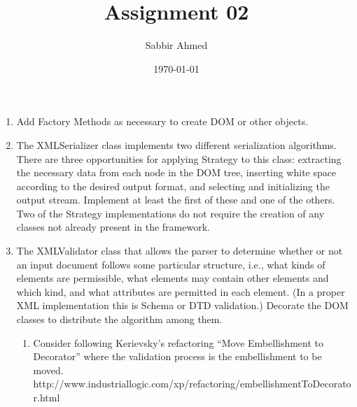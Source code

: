\documentclass{article}
\title{Assignment 02}
\author{Sabbir Ahmed}
\date{\today}
\begin{document}
\maketitle

\begin{enumerate}
    \item Add Factory Methods as necessary to create DOM or other objects.
    \item The XMLSerializer class implements two different serialization algorithms. There are three opportunities for applying Strategy to this class: extracting the necessary data from each node in the DOM tree, inserting white space according to the desired output format, and selecting and initializing the output stream. Implement at least the first of these and one of the others. Two of the Strategy implementations do not require the creation of any classes not already present in the framework.
    \item The XMLValidator class that allows the parser to determine whether or not an input document follows some particular structure, i.e., what kinds of elements are permissible, what elements may contain other elements and which kind, and what attributes are permitted in each element. (In a proper XML implementation this is Schema or DTD validation.) Decorate the DOM classes to distribute the algorithm among them.
          \begin{enumerate}
              \item Consider following Kerievsky’s refactoring “Move Embellishment to Decorator” where the validation process is the embellishment to be moved.\\
                    http://www.industriallogic.com/xp/refactoring/embellishmentToDecorator.html
          \end{enumerate}
\end{enumerate}
\end{document}
